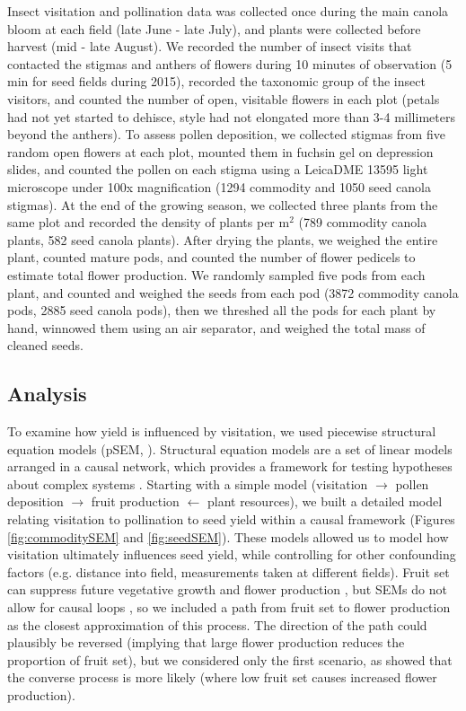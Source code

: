 \documentclass[12pt, draft]{article} %
\begin{document}
Insect visitation and pollination data was collected once during the main canola bloom at each field (late June - late July), and plants were collected before harvest (mid - late August).
We recorded the number of insect visits that contacted the stigmas and anthers of flowers during 10 minutes of observation (5 min for seed fields during 2015), recorded the taxonomic group of the insect visitors, and counted the number of open, visitable flowers in each plot (petals had not yet started to dehisce, style had not elongated more than 3-4 millimeters beyond the anthers).
To assess pollen deposition, we collected stigmas from five random open flowers at each plot, mounted them in fuchsin gel \citep{beattie1971} on depression slides, and counted the pollen on each stigma using a Leica\texttrademark DME 13595 light microscope under 100x magnification (1294 commodity and 1050 seed canola stigmas).
At the end of the growing season, we collected three plants from the same plot and recorded the density of plants per m$^2$ (789 commodity canola plants, 582 seed canola plants).
After drying the plants, we weighed the entire plant, counted mature pods, and counted the number of flower pedicels to estimate total flower production. %
We randomly sampled five pods from each plant, and counted and weighed the seeds from each pod (3872 commodity canola pods, 2885 seed canola pods), then we threshed all the pods for each plant by hand, winnowed them using an air separator, and weighed the total mass of cleaned seeds.

\subsection{Analysis}
To examine how yield is influenced by visitation, we used piecewise structural equation models (pSEM, \citealp{shipley2009}).
Structural equation models are a set of linear models arranged in a causal network, which provides a framework for testing hypotheses about complex systems \citep{grace2012, lefcheck2015}.
Starting with a simple model (visitation $\rightarrow$ pollen deposition $\rightarrow$ fruit production $\leftarrow$ plant resources), we built a detailed model relating visitation to pollination to seed yield within a causal framework (Figures \ref{fig:commoditySEM} and \ref{fig:seedSEM}).
These models allowed us to model how visitation ultimately influences seed yield, while controlling for other confounding factors (e.g. distance into field, measurements taken at different fields).
Fruit set can suppress future vegetative growth and flower production \citep{stephenson1981}, but SEMs do not allow for causal loops \citep{grace2012}, so we included a path from fruit set to flower production as the closest approximation of this process.
The direction of the path could plausibly be reversed (implying that large flower production reduces the proportion of fruit set), but we considered only the first scenario, as \citet{sabbahi2006} showed that the converse process is more likely (where low fruit set causes increased flower production).
\end{document}
